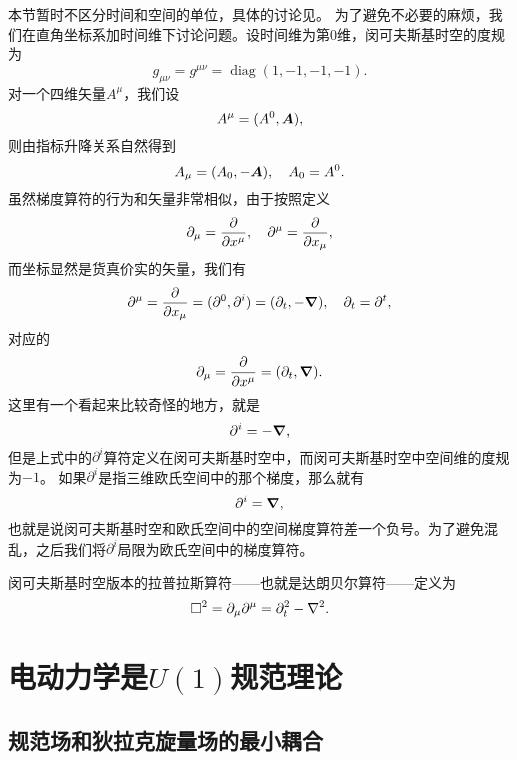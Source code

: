 \documentclass[UTF8, a4paper]{ctexart}
\DeclareMathOperator{\diag}{diag}
\begin{document}
本节暂时不区分时间和空间的单位，具体的讨论见。
为了避免不必要的麻烦，我们在直角坐标系加时间维下讨论问题。设时间维为第$0$维，闵可夫斯基时空的度规为
\begin{equation}
    g_{\mu \nu} = g^{\mu \nu} = \diag(1, -1, -1, -1).
\end{equation}
对一个四维矢量$A^\mu$，我们设
\begin{equation}
    A^\mu = (A^0, \vb*{A}),
\end{equation}
则由指标升降关系自然得到
\begin{equation}
    A_\mu = (A_0, -\vb*{A}), \quad A_0 = A^0.
\end{equation}
虽然梯度算符的行为和矢量非常相似，由于按照定义
\[
    \partial_\mu = \pdv{x^\mu}, \quad \partial^\mu = \pdv{x_\mu},
\]
而坐标显然是货真价实的矢量，我们有
\begin{equation}
    \partial^\mu = \pdv{x_\mu} = (\partial^0, \partial^i) = (\partial_t, - \grad), \quad \partial_t = \partial^t,
\end{equation}
对应的
\begin{equation}
    \partial_\mu = \pdv{x^\mu} = (\partial_t, \grad).
\end{equation}
这里有一个看起来比较奇怪的地方，就是
\[
    \partial^i = - \grad,
\]
但是上式中的$\partial^i$算符定义在闵可夫斯基时空中，而闵可夫斯基时空中空间维的度规为$-1$。
如果$\partial^i$是指三维欧氏空间中的那个梯度，那么就有
\[
    \partial^i = \grad,
\]
也就是说闵可夫斯基时空和欧氏空间中的空间梯度算符差一个负号。为了避免混乱，之后我们将$\partial^i$局限为欧氏空间中的梯度算符。

闵可夫斯基时空版本的拉普拉斯算符——也就是达朗贝尔算符——定义为
\begin{equation}
    \Box^2 = \partial_\mu \partial^\mu = \partial_t^2 - \laplacian.
\end{equation}

\section{电动力学是$U(1)$规范理论}

\subsection{规范场和狄拉克旋量场的最小耦合}
\end{document}
